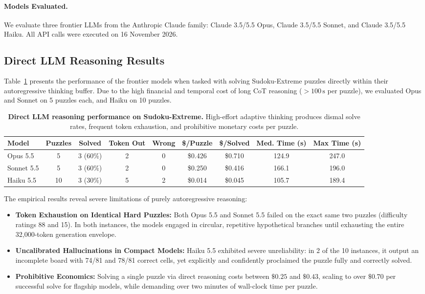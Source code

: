 \documentclass{article} %
\begin{document}
\paragraph{Models Evaluated.}
We evaluate three frontier LLMs from the Anthropic Claude family: Claude 3.5/5.5 Opus, Claude 3.5/5.5 Sonnet, and Claude 3.5/5.5 Haiku. All API calls were executed on 16 November 2026.

\subsection{Direct LLM Reasoning Results}

Table~\ref{tab:llm_direct} presents the performance of the frontier models when tasked with solving Sudoku-Extreme puzzles directly within their autoregressive thinking buffer. Due to the high financial and temporal cost of long CoT reasoning ($>100\,\mathrm{s}$ per puzzle), we evaluated Opus and Sonnet on 5 puzzles each, and Haiku on 10 puzzles.

\begin{table}[t]
\centering
\small
\caption{\textbf{Direct LLM reasoning performance on Sudoku-Extreme.} High-effort adaptive thinking produces dismal solve rates, frequent token exhaustion, and prohibitive monetary costs per puzzle.}
\label{tab:llm_direct}
\begin{tabular}{lcccccccc}
\toprule
\textbf{Model} & \textbf{Puzzles} & \textbf{Solved} & \textbf{Token Out} & \textbf{Wrong} & \textbf{\$/Puzzle} & \textbf{\$/Solved} & \textbf{Med. Time (s)} & \textbf{Max Time (s)} \\
\midrule
Opus 5.5   & 5  & 3 ($60\%$) & 2 & 0 & \$0.426 & \$0.710 & 124.9 & 247.0 \\
Sonnet 5.5 & 5  & 3 ($60\%$) & 2 & 0 & \$0.250 & \$0.416 & 166.1 & 196.0 \\
Haiku 5.5  & 10 & 3 ($30\%$) & 5 & 2 & \$0.014 & \$0.045 & 105.7 & 189.4 \\
\bottomrule
\end{tabular}
\end{table}

The empirical results reveal severe limitations of purely autoregressive reasoning:
\begin{itemize}
    \item \textbf{Token Exhaustion on Identical Hard Puzzles:} Both Opus 5.5 and Sonnet 5.5 failed on the exact same two puzzles (difficulty ratings 88 and 15). In both instances, the models engaged in circular, repetitive hypothetical branches until exhausting the entire 32,000-token generation envelope.
    \item \textbf{Uncalibrated Hallucinations in Compact Models:} Haiku 5.5 exhibited severe unreliability: in 2 of the 10 instances, it output an incomplete board with 74/81 and 78/81 correct cells, yet explicitly and confidently proclaimed the puzzle fully and correctly solved.
    \item \textbf{Prohibitive Economics:} Solving a single puzzle via direct reasoning costs between $\$0.25$ and $\$0.43$, scaling to over $\$0.70$ per successful solve for flagship models, while demanding over two minutes of wall-clock time per puzzle.
\end{itemize}
\end{document}
